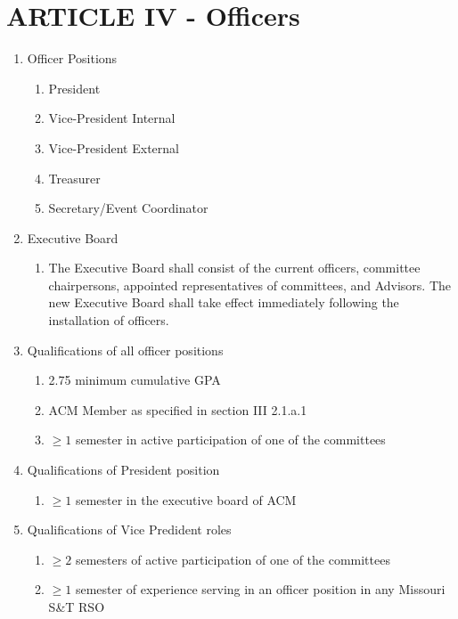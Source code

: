 \section{ARTICLE IV - Officers}
\begin{enumerate}[label=\Alph*.]
  \item Officer Positions
    \begin{enumerate}[label=\arabic*.]
      \item President
      \item Vice-President Internal
      \item Vice-President External
      \item Treasurer
      \item Secretary/Event Coordinator
    \end{enumerate}
  \item Executive Board
    \begin{enumerate}[label=\arabic*.]
      \item The Executive Board shall consist of the current officers, committee
      chairpersons, appointed representatives of committees, and Advisors. The
      new Executive Board shall take effect immediately following the
      installation of officers.
    \end{enumerate}
  \item Qualifications of all officer positions
    \begin{enumerate}[label=\arabic*.]
      \item 2.75 minimum cumulative GPA
      \item ACM Member as specified in section III 2.1.a.1
      \item $\geq{1}$ semester in active participation of one of the committees
    \end{enumerate}
  \item Qualifications of President position
    \begin{enumerate}[label=\arabic*.]
      \item $\geq{1}$ semester in the executive board of ACM
    \end{enumerate}
  \item Qualifications of Vice Predident roles
    \begin{enumerate}[label=\arabic*.]
      \item $\geq{2}$ semesters of active participation of one of the committees
      \item $\geq{1}$ semester of experience serving in an officer position in
      any Missouri S\&T RSO
    \end{enumerate}
 

\end{enumerate}
